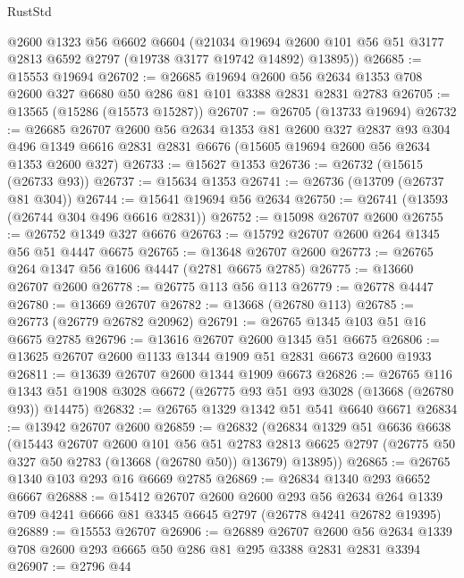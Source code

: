 \begin{lexlean}{RustStd}
\begin{coremodule}
      @2600
      @1323
      @56
      @6602
      @6604
      (@21034
        @19694
        @2600
        @101
        @56
        @51
        @3177
        @2813
        @6592
        @2797
        (@19738 @3177 @19742 @14892)
        @13895))
@26685 := @15553 @19694
@26702 := @26685
    @19694
    @2600
    @56
    @2634
    @1353
    @708
    @2600
    @327
    @6680
    @50
    @286
    @81
    @101
    @3388
    @2831
    @2831
    @2783
@26705 := @13565 (@15286 (@15573 @15287))
@26707 := @26705 (@13733 @19694)
@26732 := @26685
    @26707
    @2600
    @56
    @2634
    @1353
    @81
    @2600
    @327
    @2837
    @93
    @304
    @496
    @1349
    @6616
    @2831
    @2831
    @6676
    (@15605 @19694 @2600 @56 @2634 @1353 @2600 @327)
@26733 := @15627 @1353
@26736 := @26732 (@15615 (@26733 @93))
@26737 := @15634 @1353
@26741 := @26736 (@13709 (@26737 @81 @304))
@26744 := @15641 @19694 @56 @2634
@26750 := @26741 (@13593 (@26744 @304 @496 @6616 @2831))
@26752 := @15098 @26707 @2600
@26755 := @26752 @1349 @327 @6676
@26763 := @15792 @26707 @2600 @264 @1345 @56 @51 @4447 @6675
@26765 := @13648 @26707 @2600
@26773 := @26765 @264 @1347 @56 @1606 @4447 (@2781 @6675 @2785)
@26775 := @13660 @26707 @2600
@26778 := @26775 @113 @56 @113
@26779 := @26778 @4447
@26780 := @13669 @26707
@26782 := @13668 (@26780 @113)
@26785 := @26773 (@26779 @26782 @20962)
@26791 := @26765 @1345 @103 @51 @16 @6675 @2785
@26796 := @13616 @26707 @2600 @1345 @51 @6675
@26806 := @13625 @26707 @2600 @1133 @1344 @1909 @51 @2831 @6673 @2600 @1933
@26811 := @13639 @26707 @2600 @1344 @1909 @6673
@26826 := @26765
    @116
    @1343
    @51
    @1908
    @3028
    @6672
    (@26775 @93 @51 @93 @3028 (@13668 (@26780 @93)) @14475)
@26832 := @26765 @1329 @1342 @51 @541 @6640 @6671
@26834 := @13942 @26707 @2600
@26859 := @26832
    (@26834
      @1329
      @51
      @6636
      @6638
      (@15443
        @26707
        @2600
        @101
        @56
        @51
        @2783
        @2813
        @6625
        @2797
        (@26775 @50 @327 @50 @2783 (@13668 (@26780 @50)) @13679)
        @13895))
@26865 := @26765 @1340 @103 @293 @16 @6669 @2785
@26869 := @26834 @1340 @293 @6652 @6667
@26888 := @15412
    @26707
    @2600
    @2600
    @293
    @56
    @2634
    @264
    @1339
    @709
    @4241
    @6666
    @81
    @3345
    @6645
    @2797
    (@26778 @4241 @26782 @19395)
@26889 := @15553 @26707
@26906 := @26889
    @26707
    @2600
    @56
    @2634
    @1339
    @708
    @2600
    @293
    @6665
    @50
    @286
    @81
    @295
    @3388
    @2831
    @2831
    @3394
@26907 := @2796 @44

\end{coremodule}
\end{lexlean}
